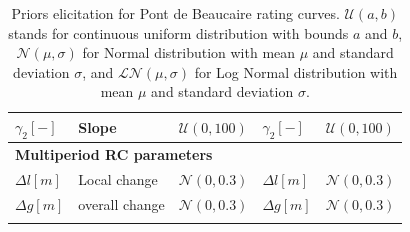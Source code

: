 \documentclass[11pt]{article}
\begin{document}
\begin{table}[h!]
\begin{tabular}{|l|l|l|l|l|}
            $\gamma_{2} [-]$ & Slope & $\mathcal{U}(0,100)$ & $\gamma_{2} [-]$ &$\mathcal{U}(0,100)$  \\
            \hline
            \multicolumn{5}{|l|}{\textbf{Multiperiod RC parameters}} \\
            $\Delta l [m]$     &   Local change    &  $\mathcal{N}(0,0.3)$&      $\Delta l [m]$     &$\mathcal{N}(0,0.3)$\\
            $\Delta g [m]$     &   overall change       &  $\mathcal{N}(0,0.3)$&      $\Delta g [m]$     &$\mathcal{N}(0,0.3)$\\
            \lasthline
        \end{tabular} 
        \caption{Priors elicitation for Pont de Beaucaire rating curves. $\mathcal{U}(a,b)$ stands for continuous uniform distribution with bounds $a$ and $b$, $\mathcal{N}(\mu,\sigma)$ for Normal distribution with mean $\mu$  and standard deviation $\sigma$, and $\mathcal{LN}(\mu,\sigma)$ for Log Normal distribution with mean $\mu$ and standard deviation $\sigma$.}
        \label{tab:PriorPt}
    \end{table}
\end{document}
